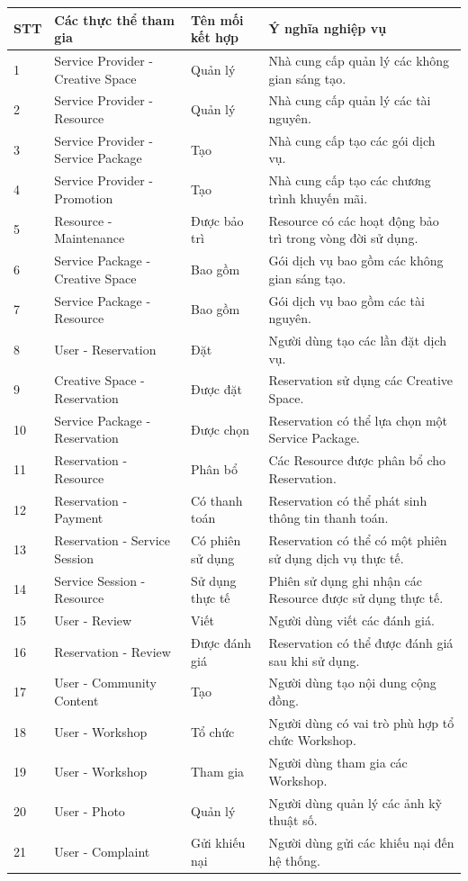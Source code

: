 \begin{center}
\scriptsize
\begin{tabular}{p{.05\linewidth} p{.20\linewidth} p{.17\linewidth} p{.34\linewidth}}
\toprule
STT & Các thực thể tham gia & Tên mối kết hợp & Ý nghĩa nghiệp vụ \\
\midrule
1 & Service Provider - Creative Space & Quản lý & Nhà cung cấp quản lý các không gian sáng tạo. \\
2 & Service Provider - Resource & Quản lý & Nhà cung cấp quản lý các tài nguyên. \\
3 & Service Provider - Service Package & Tạo & Nhà cung cấp tạo các gói dịch vụ. \\
4 & Service Provider - Promotion & Tạo & Nhà cung cấp tạo các chương trình khuyến mãi. \\
5 & Resource - Maintenance & Được bảo trì & Resource có các hoạt động bảo trì trong vòng đời sử dụng. \\
6 & Service Package - Creative Space & Bao gồm & Gói dịch vụ bao gồm các không gian sáng tạo. \\
7 & Service Package - Resource & Bao gồm & Gói dịch vụ bao gồm các tài nguyên. \\
8 & User - Reservation & Đặt & Người dùng tạo các lần đặt dịch vụ. \\
9 & Creative Space - Reservation & Được đặt & Reservation sử dụng các Creative Space. \\
10 & Service Package - Reservation & Được chọn & Reservation có thể lựa chọn một Service Package. \\
11 & Reservation - Resource & Phân bổ & Các Resource được phân bổ cho Reservation. \\
12 & Reservation - Payment & Có thanh toán & Reservation có thể phát sinh thông tin thanh toán. \\
13 & Reservation - Service Session & Có phiên sử dụng & Reservation có thể có một phiên sử dụng dịch vụ thực tế. \\
14 & Service Session - Resource & Sử dụng thực tế & Phiên sử dụng ghi nhận các Resource được sử dụng thực tế. \\
15 & User - Review & Viết & Người dùng viết các đánh giá. \\
16 & Reservation - Review & Được đánh giá & Reservation có thể được đánh giá sau khi sử dụng. \\
17 & User - Community Content & Tạo & Người dùng tạo nội dung cộng đồng. \\
18 & User - Workshop & Tổ chức & Người dùng có vai trò phù hợp tổ chức Workshop. \\
19 & User - Workshop & Tham gia & Người dùng tham gia các Workshop. \\
20 & User - Photo & Quản lý & Người dùng quản lý các ảnh kỹ thuật số. \\
21 & User - Complaint & Gửi khiếu nại & Người dùng gửi các khiếu nại đến hệ thống. \\
\bottomrule
\end{tabular}
\end{center}

